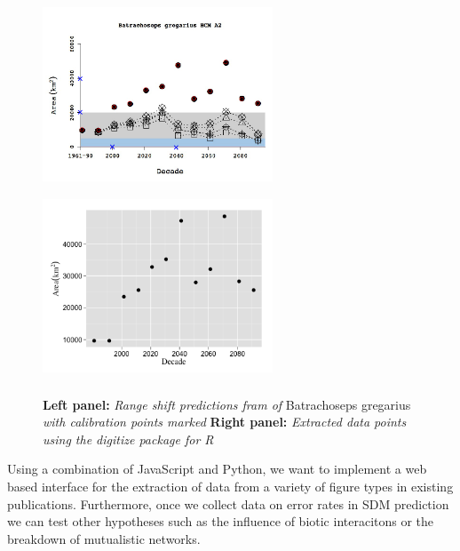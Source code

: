 \documentclass[pdftex,11pt,a4paper]{article}\usepackage{graphicx, color}
\begin{document}
\begin{figure}[!h]
\centering
\includegraphics[height=2.2in,width=2.7in]{ExtractPlot.png}
\includegraphics[height=2.2in,width=2.7in]{exportdat.png}
\caption{\textbf{Left panel: }\textit{Range shift predictions fram \citet{Early2011a} of} Batrachoseps gregarius \textit{ with calibration points marked} \textbf{Right panel: } \textit{Extracted data points using the digitize package for R \citep{Poisot2011}}}

\end{figure}
Using a combination of JavaScript and Python, we want to implement a web based interface for the extraction of data from a variety of figure types in existing publications.
Furthermore, once we collect data on error rates in SDM prediction we can test other hypotheses such as the influence of biotic interacitons or the breakdown of mutualistic networks.
\end{document}
